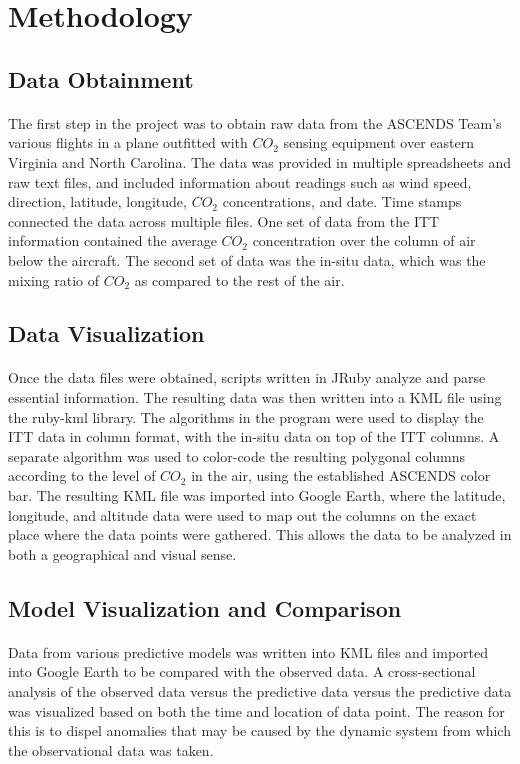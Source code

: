 \documentclass[12pt,letterpaper]{report}
\begin{document}
 \section*{Methodology}
  \subsection*{Data Obtainment}
   \paragraph{}
    The first step in the project was to obtain raw data from the ASCENDS Team's various flights in a plane outfitted with $CO_2$ sensing equipment over eastern Virginia and North Carolina.  The data was provided in multiple spreadsheets and raw text files, and included information about readings such as wind speed, direction, latitude, longitude, $CO_2$ concentrations, and date. Time stamps connected the data across multiple files. One set of data from the ITT information contained the average $CO_2$ concentration over the column of air below the aircraft. The second set of data was the in-situ data, which was the mixing ratio of $CO_2$ as compared to the rest of the air.
  \subsection*{Data Visualization}
   \paragraph{}
    Once the data files were obtained, scripts written in JRuby analyze and parse essential information. The resulting data was then written into a KML file using the ruby-kml library. The algorithms in the program were used to display the ITT data in column format, with the in-situ data on top of the ITT columns. A separate algorithm was used to color-code the resulting polygonal columns according to the level of $CO_2$ in the air, using the established ASCENDS color bar. The resulting KML file was imported into Google Earth, where the latitude, longitude, and altitude data were used to map out the columns on the exact place where the data points were gathered. This allows the data to be analyzed in both a geographical and visual sense.
  \subsection*{Model Visualization and Comparison}
   \paragraph{}
  Data from various predictive models was written into KML files and imported into Google Earth to be compared with the observed data. A cross-sectional analysis of the observed data versus the predictive data versus the predictive data was visualized based on both the time and location of data point. The reason for this is to dispel anomalies that may be caused by the dynamic system from which the observational data was taken.  
\end{document}
